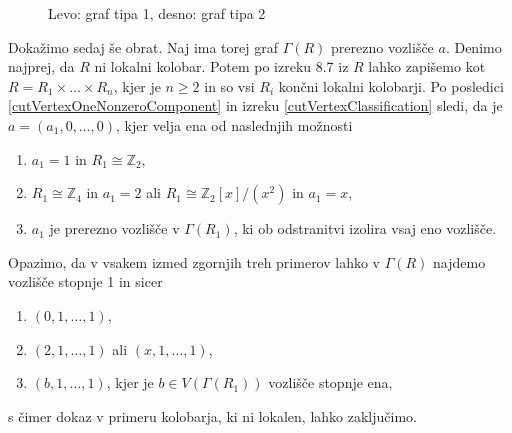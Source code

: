 \documentclass[a4paper, 12pt]{amsart}
\theoremstyle{definition} %
\theoremstyle{plain} %
\newcommand{\Z}{\mathbb Z}
\begin{document}
\begin{figure}[h!]
\centering
\caption{Levo: graf tipa 1, desno: graf tipa 2}
\label{tip1,2}
\end{figure}

Dokažimo sedaj še obrat. Naj ima torej graf $\Gamma(R)$ prerezno vozlišče $a$. Denimo najprej, da $R$ ni lokalni kolobar. Potem po izreku 8.7 iz \cite{Atiyah} $R$ lahko zapišemo kot $R=R_1 \times \dots \times R_n$, kjer je $n\ge 2$ in so vsi $R_i$ končni lokalni kolobarji. Po posledici \ref{cutVertexOneNonzeroComponent} in  izreku \ref{cutVertexClassification} sledi, da je $a = (a_1,0,\dots,0)$, kjer velja ena od naslednjih možnosti
\begin{enumerate}
\item $a_1 = 1$ in $R_1\cong \Z_2$,
\item $R_1 \cong \Z_4$ in $a_1 = 2$ ali $R_1 \cong \Z_2[x] / (x^2)$ in $a_1 = x$,
\item $a_1$ je prerezno vozlišče v $\Gamma(R_1)$, ki ob odstranitvi izolira vsaj eno vozlišče.
\end{enumerate}
Opazimo, da v vsakem izmed zgornjih treh primerov lahko v $\Gamma(R)$ najdemo vozlišče stopnje 1 in sicer 
\begin{enumerate}
\item $(0,1,\dots,1)$,
\item $(2,1,\dots,1)$ ali $(x,1,\dots,1)$,
\item $(b,1,\dots,1)$, kjer je $b\in V(\Gamma(R_1))$ vozlišče stopnje ena,
\end{enumerate}
s čimer dokaz v primeru kolobarja, ki ni lokalen, lahko zaključimo. 
\end{document}
